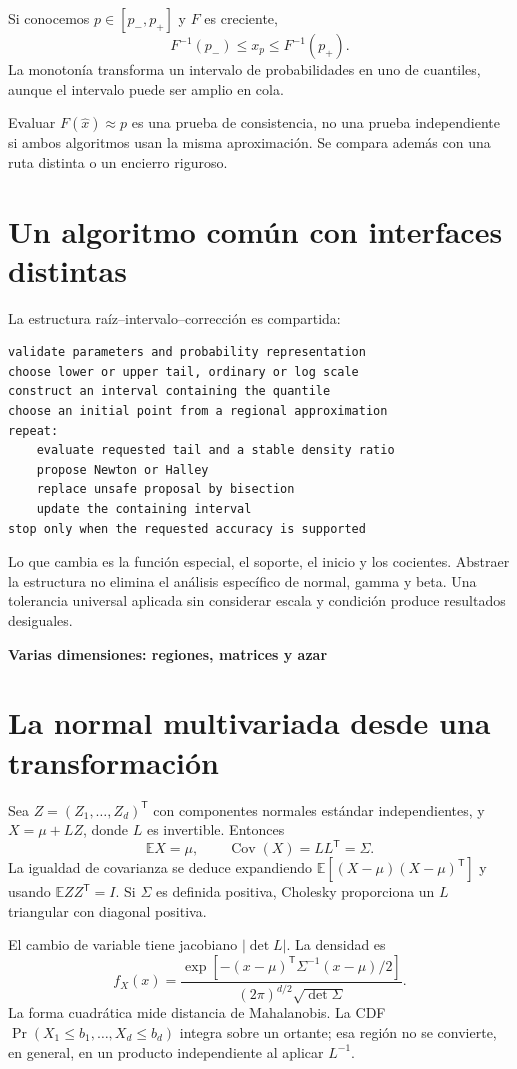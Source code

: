 \documentclass[11pt,a4paper]{article}
\newcommand{\E}{\mathbb E}
\newcommand{\T}{^{\mathsf T}}
\DeclareMathOperator{\Cov}{Cov}
\theoremstyle{definition}
\newcommand{\parte}[1]{\par\bigskip\Needspace{8\baselineskip}\begin{center}{\Large\bfseries\color{azul}#1}\end{center}}
\begin{document}
Si conocemos $p\in[p_-,p_+]$ y $F$ es creciente,
\[
F^{-1}(p_-)\le x_p\le F^{-1}(p_+).
\]
La monotonía transforma un intervalo de probabilidades en uno de cuantiles, aunque el intervalo puede ser amplio en cola.

Evaluar $F(\widehat x)\approx p$ es una prueba de consistencia, no una prueba independiente si ambos algoritmos usan la misma aproximación. Se compara además con una ruta distinta o un encierro riguroso.

\section{Un algoritmo común con interfaces distintas}
La estructura raíz--intervalo--corrección es compartida:
\begin{lstlisting}
validate parameters and probability representation
choose lower or upper tail, ordinary or log scale
construct an interval containing the quantile
choose an initial point from a regional approximation
repeat:
    evaluate requested tail and a stable density ratio
    propose Newton or Halley
    replace unsafe proposal by bisection
    update the containing interval
stop only when the requested accuracy is supported
\end{lstlisting}
Lo que cambia es la función especial, el soporte, el inicio y los cocientes. Abstraer la estructura no elimina el análisis específico de normal, gamma y beta. Una tolerancia universal aplicada sin considerar escala y condición produce resultados desiguales.



\parte{Varias dimensiones: regiones, matrices y azar}
\section{La normal multivariada desde una transformación}
Sea $Z=(Z_1,\ldots,Z_d)\T$ con componentes normales estándar independientes, y $X=\mu+LZ$, donde $L$ es invertible. Entonces
\[
\E X=\mu,\qquad \Cov(X)=LL\T=\Sigma.
\]
La igualdad de covarianza se deduce expandiendo $\E[(X-\mu)(X-\mu)\T]$ y usando $\E ZZ\T=I$. Si $\Sigma$ es definida positiva, Cholesky proporciona un $L$ triangular con diagonal positiva.

El cambio de variable tiene jacobiano $|\det L|$. La densidad es
\[
f_X(x)=\frac{\exp[-(x-\mu)\T\Sigma^{-1}(x-\mu)/2]}
{(2\pi)^{d/2}\sqrt{\det\Sigma}}.
\]
La forma cuadrática mide distancia de Mahalanobis. La CDF
$\Pr(X_1\le b_1,\ldots,X_d\le b_d)$ integra sobre un ortante; esa región no se convierte, en general, en un producto independiente al aplicar $L^{-1}$.
\end{document}

